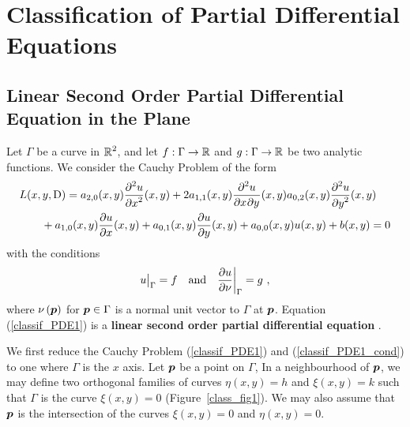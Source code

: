 \chapter{Classification of Partial Differential
Equations} \label{ChapClassifPDE}

\section{Linear Second Order Partial Differential Equation in
the Plane} \label{classif_reduction_lsoPDE}

Let $\Gamma$ be a curve in $\DS \RR^2$, and let
$f:\Gamma\rightarrow \RR$ and $g:\Gamma\rightarrow \RR$ be two
analytic functions.  We consider the Cauchy Problem of the form
\begin{equation} \label{classif_PDE1}
\begin{split}
& L(x,y,\diff) = a_{2,0}(x,y) \pdydxn{u}{x}{2}(x,y) + 2a_{1,1}(x,y)
\pdydxnm{u}{x}{y}{2}{}{}(x,y) a_{0,2}(x,y) \pdydxn{u}{y}{2}(x,y) \\
&\qquad  + a_{1,0}(x,y) \pdydx{u}{x}(x,y)
+ a_{0,1}(x,y) \pdydx{u}{y}(x,y) + a_{0,0}(x,y)u(x,y) + b(x,y) = 0
\end{split}
\end{equation}
with the conditions
\begin{equation} \label{classif_PDE1_cond}
u\big|_\Gamma = f \quad \text{and} \quad \pdydx{u}{\nu}\bigg|_\Gamma = g \ ,
\end{equation}
where $\DS \nu\left(\VEC{p}\right)$ for $\VEC{p} \in \Gamma$
is a normal unit vector to $\Gamma$ at $\VEC{p}$.
Equation (\ref{classif_PDE1}) is a
{\bfseries linear second order partial differential equation}%
. 

We first reduce the Cauchy Problem (\ref{classif_PDE1}) and
(\ref{classif_PDE1_cond}) to one where $\Gamma$ is the $x$ axis.  Let
$\VEC{p}$ be a point on $\Gamma$,  In a neighbourhood of $\VEC{p}$, we
may define two orthogonal families of curves $\eta(x,y)=h$ and
$\xi(x,y)=k$ such that $\Gamma$ is the curve $\xi(x,y)=0$
(Figure~\ref{class_fig1}).  We may also assume that $\VEC{p}$ is the
intersection of the curves $\xi(x,y)=0$ and $\eta(x,y)=0$.


